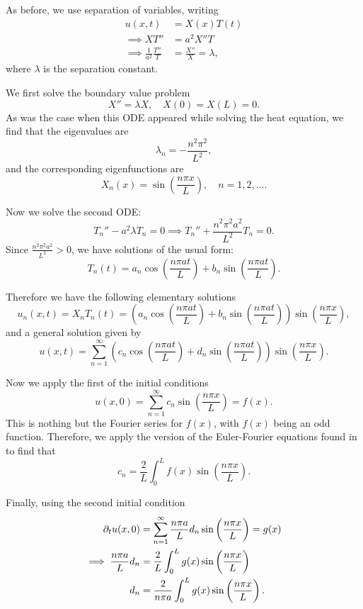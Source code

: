 As before, we use separation of variables, writing
\begin{align*}
	u(x,t) &= X(x) T(t) \\
	\implies XT'' &= a^2 X''T \\
	\implies \frac{1}{a^2} \frac{T''}{T} &= \frac{X''}{X} = \lambda,
\end{align*}
where $\lambda$ is the separation constant.

We first solve the boundary value problem
\[
X'' = \lambda X, \quad X(0) = X(L) = 0.
\]
As was the case when this ODE appeared while solving the heat equation, we find that the eigenvalues are
\[
\lambda_n = -\frac{n^2\pi^2}{L^2},
\]
and the corresponding eigenfunctions are
\[
X_n(x) = \sin\left(\frac{n\pi x}{L}\right), \quad n = 1, 2, \dots.
\]

Now we solve the second ODE:
\[
T_n'' - a^2\lambda T_n = 0 \implies T_n'' + \frac{n^2\pi^2a^2}{L^2}T_n = 0.
\]
Since $\frac{n^2\pi^2a^2}{L^2} > 0$, we have solutions of the usual form:
\[
T_n(t) = a_n \cos\left(\frac{n\pi at}{L}\right) + b_n \sin\left(\frac{n\pi at}{L}\right).
\]

Therefore we have the following elementary solutions
\[
u_n(x,t) = X_n T_n(t) = \left(a_n \cos\left(\frac{n\pi at}{L}\right) + b_n \sin\left(\frac{n\pi at}{L}\right)\right) \sin\left(\frac{n\pi x}{L}\right), 
\]
and a general solution given by
\begin{equation}
	u(x,t) = \sum_{n=1}^{\infty} \left(c_n \cos\left(\frac{n\pi at}{L}\right) + d_n \sin\left(\frac{n\pi at}{L}\right)\right) \sin\left(\frac{n\pi x}{L}\right).
\end{equation}

Now we apply the first of the initial conditions
\[
u(x,0) = \sum_{n=1}^{\infty} c_n \sin\left(\frac{n\pi x}{L}\right) = f(x).
\]
This is nothing but the Fourier series for $f(x)$, with $f(x)$ being an odd function. Therefore, we apply the version of the Euler-Fourier equations found in  to find that
\begin{equation}
	c_n = \frac{2}{L} \int_0^L f(x) \sin\left(\frac{n\pi x}{L}\right).
\end{equation}

Finally, using the second initial condition
\begin{align}
	\partial_t u(x,0) &= \sum_{n=1}^{\infty}\frac{n\pi a}{L} d_n \sin\left(\frac{n\pi x}{L}\right) = g(x) \nonumber \\
	\implies \frac{n\pi a}{L} d_n &= \frac{2}{L} \int_0^L g(x) \sin\left(\frac{n\pi x}{L}\right) \nonumber \\
	d_n &= \frac{2}{n\pi a} \int_0^L g(x) \sin\left(\frac{n\pi x}{L}\right).
\end{align}

